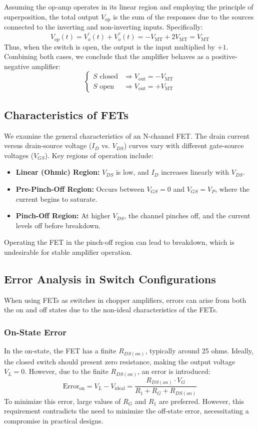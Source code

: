 \documentclass[a4paper,9pt,twoside,openany,twocolumn]{memoir}
\begin{document}
Assuming the op-amp operates in its linear region and employing the principle of superposition, the total output \( V_{\text{op}} \) is the sum of the responses due to the sources connected to the inverting and non-inverting inputs. Specifically:
\[
V_{op}(t) = V_o^{'}(t)  + V_o^{''}(t)  = -V_{\text{MT}} + 2V_{\text{MT}} = V_{\text{MT}}
\]
Thus, when the switch is open, the output is the input multiplied by \( +1 \). Combining both cases, we conclude that the amplifier behaves as a positive-negative amplifier:
\[
\begin{cases}
S \text{ closed} & \Rightarrow V_{\text{out}} = -V_{\text{MT}} \\
S \text{ open}   & \Rightarrow V_{\text{out}} = +V_{\text{MT}}
\end{cases}
\]

\subsection{Characteristics of FETs}
We examine the general characteristics of an N-channel FET. The drain current versus drain-source voltage (\( I_D \) vs. \( V_{DS} \)) curves vary with different gate-source voltages (\( V_{GS} \)). Key regions of operation include:
\begin{itemize}
    \item \textbf{Linear (Ohmic) Region:} \( V_{DS} \) is low, and \( I_D \) increases linearly with \( V_{DS} \).
    \item \textbf{Pre-Pinch-Off Region:} Occurs between \( V_{GS} = 0 \) and \( V_{GS} = V_P \), where the current begins to saturate.
    \item \textbf{Pinch-Off Region:} At higher \( V_{DS} \), the channel pinches off, and the current levels off before breakdown.
\end{itemize}
Operating the FET in the pinch-off region can lead to breakdown, which is undesirable for stable amplifier operation.

\subsection{Error Analysis in Switch Configurations}
When using FETs as switches in chopper amplifiers, errors can arise from both the on and off states due to the non-ideal characteristics of the FETs.

\subsubsection{On-State Error}
In the on-state, the FET has a finite \( R_{DS(on)} \), typically around 25 ohms. Ideally, the closed switch should present zero resistance, making the output voltage \( V_L = 0 \). However, due to the finite \( R_{DS(on)} \), an error is introduced:
\[
\text{Error}_{\text{on}} = V_L - V_{\text{ideal}} = \frac{R_{DS(on)} \cdot V_G}{R_1 + R_G + R_{DS(on)}}
\]
To minimize this error, large values of \( R_G \) and \( R_1 \) are preferred. However, this requirement contradicts the need to minimize the off-state error, necessitating a compromise in practical designs.
\end{document}
